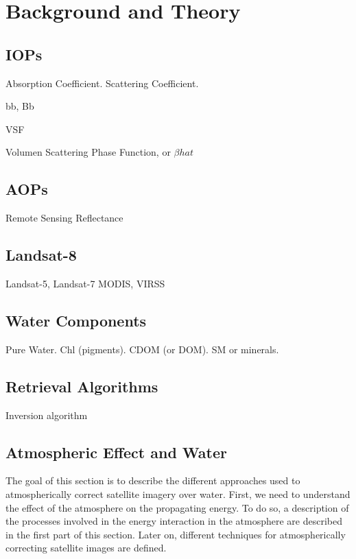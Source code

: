 \chapter{ Background and Theory}
\label{ch:background}
\section{ IOPs}

Absorption Coefficient.
Scattering Coefficient.

bb, Bb


VSF

Volumen Scattering Phase Function, or $\beta{hat}$ 
\section{ AOPs}
Remote Sensing Reflectance
\section{ Landsat-8}
Landsat-5, Landsat-7
MODIS, VIRSS
\section{ Water Components}
Pure Water. Chl (pigments). CDOM (or DOM). SM or minerals.
\section{Retrieval Algorithms}
Inversion algorithm 

\section{Atmospheric Effect and Water} 
The goal of this section is to describe the different approaches used to atmospherically correct satellite imagery over water. First, we need to understand the effect of the atmosphere on the propagating energy. To do so, a description of the processes involved in the energy interaction in the atmosphere are described in the first part of this section. Later on, different techniques for atmospherically correcting satellite images are defined.

